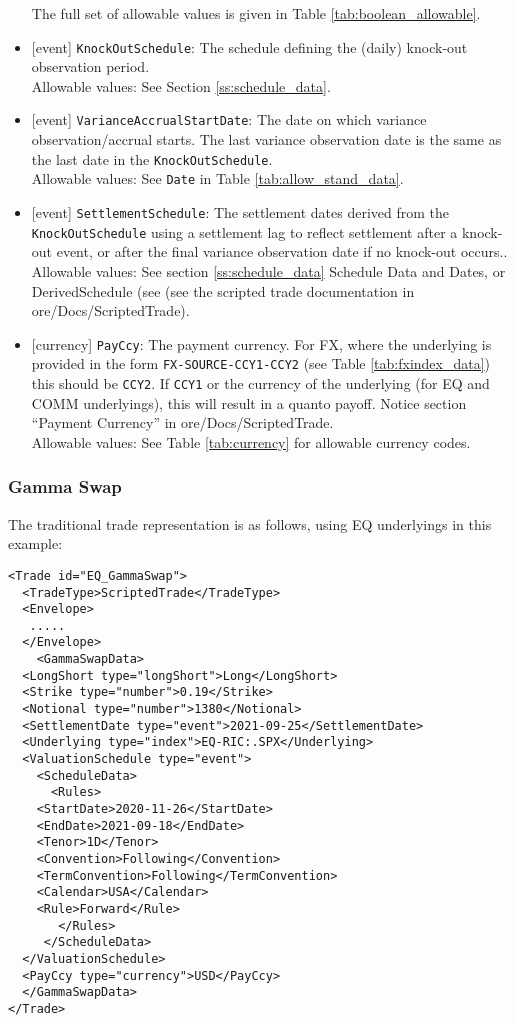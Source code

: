 \begin{itemize}
  The full set of allowable values is given in Table \ref{tab:boolean_allowable}.
  \item{}[event] \lstinline!KnockOutSchedule!: The schedule defining the (daily) knock-out observation period. \\
  Allowable values: See Section \ref{ss:schedule_data}.
  \item{}[event] \lstinline!VarianceAccrualStartDate!: The date on which variance observation/accrual starts. The last variance
  observation date is the same as the last date in the \lstinline!KnockOutSchedule!.  \\
  Allowable values: See \lstinline!Date! in Table \ref{tab:allow_stand_data}.
  \item{}[event] \lstinline!SettlementSchedule!: The settlement dates derived from the \lstinline!KnockOutSchedule! using a
  settlement lag to reflect settlement after a knock-out event, or after the final variance observation date if
  no knock-out occurs.. \\
  Allowable values: See section \ref{ss:schedule_data} Schedule Data and Dates, or DerivedSchedule (see (see the scripted trade
  documentation in ore/Docs/ScriptedTrade).
  \item{}[currency] \lstinline!PayCcy!: The payment currency. For FX, where the underlying is provided
      in the form \lstinline!FX-SOURCE-CCY1-CCY2! (see Table \ref{tab:fxindex_data}) this should
      be \lstinline!CCY2!. If \lstinline!CCY1! or the currency of the underlying (for EQ and
      COMM underlyings), this will result in a quanto payoff. Notice section ``Payment Currency'' in ore/Docs/ScriptedTrade. \\
        Allowable values: See Table \ref{tab:currency} for allowable currency codes.
\end{itemize}

\subsubsection*{Gamma Swap}

The traditional trade representation is as follows, using EQ underlyings in this example:

\begin{verbatim}
<Trade id="EQ_GammaSwap">
  <TradeType>ScriptedTrade</TradeType>
  <Envelope>
   .....
  </Envelope>
    <GammaSwapData>
  <LongShort type="longShort">Long</LongShort>
  <Strike type="number">0.19</Strike>
  <Notional type="number">1380</Notional>
  <SettlementDate type="event">2021-09-25</SettlementDate>
  <Underlying type="index">EQ-RIC:.SPX</Underlying>
  <ValuationSchedule type="event">
    <ScheduleData>
      <Rules>
    <StartDate>2020-11-26</StartDate>
    <EndDate>2021-09-18</EndDate>
    <Tenor>1D</Tenor>
    <Convention>Following</Convention>
    <TermConvention>Following</TermConvention>
    <Calendar>USA</Calendar>
    <Rule>Forward</Rule>
       </Rules>
     </ScheduleData>
  </ValuationSchedule>
  <PayCcy type="currency">USD</PayCcy>
  </GammaSwapData>
</Trade>
\end{verbatim}


